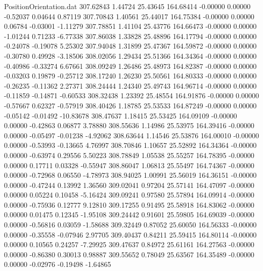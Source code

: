 \begin{filecontents}{PositionOrientation.dat}
 307.62843    1.44724   25.43645   164.68414   -0.00000    0.00000   -0.52037    0.04644    0.87119
 307.70843    1.40561   25.44017   164.75384   -0.00000    0.00000    0.06784   -0.03001   -1.11279
 307.78851    1.41104   25.43776   164.66473   -0.00000    0.00000   -1.01244    0.71233   -6.77338
 307.86038    1.33828   25.48896   164.17794   -0.00000    0.00000   -0.24078   -0.19078    5.25302
 307.94048    1.31899   25.47367   164.59872   -0.00000    0.00000   -0.30780    0.49928   -3.18506
 308.02056    1.29434   25.51366   164.34364   -0.00000    0.00000   -0.40986   -0.33274    6.67661
 308.09249    1.26486   25.48973   164.82387   -0.00000    0.00000   -0.03203    0.19879   -0.25712
 308.17240    1.26230   25.50561   164.80333   -0.00000    0.00000   -0.26235   -0.11362    2.27371
 308.24444    1.24340   25.49743   164.96714   -0.00000    0.00000   -0.11859   -0.14871   -0.60533
 308.32438    1.23392   25.48554   164.91876   -0.00000    0.00000   -0.57667    0.62327   -0.57919
 308.40426    1.18785   25.53533   164.87249   -0.00000    0.00000   -0.05142   -0.01492  -10.83678
 308.47637    1.18415   25.53425   164.09109   -0.00000    0.00000   -0.42863    0.06877    3.78880
 308.55636    1.14986   25.53975   164.39416   -0.00000    0.00000   -0.05497   -0.01238   -4.92062
 308.63644    1.14546   25.53876   164.00010   -0.00000    0.00000   -0.53993   -0.13665    4.76997
 308.70846    1.10657   25.52892   164.34364   -0.00000    0.00000   -0.63974    0.29556    5.50223
 308.78849    1.05538   25.55257   164.78395   -0.00000    0.00000    0.17711    0.03328   -0.55947
 308.86047    1.06813   25.55497   164.74367   -0.00000    0.00000   -0.72968    0.06550   -4.78973
 308.94025    1.00991   25.56019   164.36151   -0.00000    0.00000   -0.47244    0.13992    1.36560
 309.02041    0.97204   25.57141   164.47097   -0.00000    0.00000    0.05224    0.10458   -5.16424
 309.09241    0.97580   25.57894   164.09914   -0.00000    0.00000   -0.75936    0.12777    9.12810
 309.17255    0.91495   25.58918   164.83062   -0.00000    0.00000    0.01475    0.12345   -1.95108
 309.24442    0.91601   25.59805   164.69039   -0.00000    0.00000   -0.56816    0.03059   -1.58688
 309.32449    0.87052   25.60050   164.56333   -0.00000    0.00000   -0.35558   -0.07946    2.97705
 309.40437    0.84211   25.59415   164.80114   -0.00000    0.00000    0.10565    0.24257   -7.29925
 309.47637    0.84972   25.61161   164.27563   -0.00000    0.00000   -0.86380    0.30013    0.98887
 309.55652    0.78049   25.63567   164.35489   -0.00000    0.00000   -0.02976   -0.19498   -1.64865

\end{filecontents}
